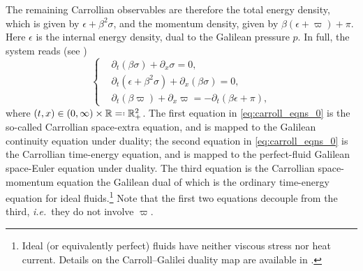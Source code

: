 \documentclass[11pt,a4paper,reqno]{amsart}
\numberwithin{equation}{section}
\theoremstyle{definition}
\theoremstyle{remark}
\newcommand*{\eqdef}{=\mathrel{\vcenter{\baselineskip0.5ex \lineskiplimit0pt
                     \hbox{\scriptsize.}\hbox{\scriptsize.}}}%
                     }
\begin{document}
 The remaining Carrollian observables are therefore the total energy density, which is given by $\epsilon + \beta^2 \sigma$, and the momentum density, given by $\beta( \epsilon + \varpi) + \pi$. Here $\epsilon$ is the internal energy density, dual to the Galilean pressure $p$. In full, the system reads (see \cite[Eqs.~(94)--(96)]{AthanasiouPetropoulosSchulzTaujanskas24b})
%
\begin{equation}\label{eq:carroll_eqns_0}
    \left\lbrace\begin{aligned}
        &\partial_t (\beta \sigma) + \partial_x \sigma = 0, \\ 
        & \partial_t (\epsilon + \beta^2 \sigma) + \partial_x (\beta \sigma) = 0, \\
        & \partial_t (\beta \varpi) + \partial_x \varpi = - \partial_t (\beta \epsilon  + \pi), 
    \end{aligned}\right.
\end{equation}
%
where $(t,x) \in (0,\infty) \times \mathbb{R} \eqdef \mathbb{R}^2_+$. The first equation in \eqref{eq:carroll_eqns_0} is the so-called Carrollian space-extra equation, and is mapped to the Galilean continuity equation under duality; the second equation in \eqref{eq:carroll_eqns_0} is the Carrollian time-energy equation, and is mapped to the perfect-fluid Galilean space-Euler equation under duality. The third equation is the Carrollian space-momentum equation the Galilean dual of which is the ordinary time-energy equation for ideal fluids.\footnote{Ideal (or equivalently perfect) fluids have neither viscous stress nor heat current. Details on the Carroll--Galilei duality map are available in \cite{AthanasiouPetropoulosSchulzTaujanskas24a,AthanasiouPetropoulosSchulzTaujanskas24b}.} Note that the first two equations decouple from the third, \textit{i.e.}~they do not involve $\varpi$.
\end{document}
